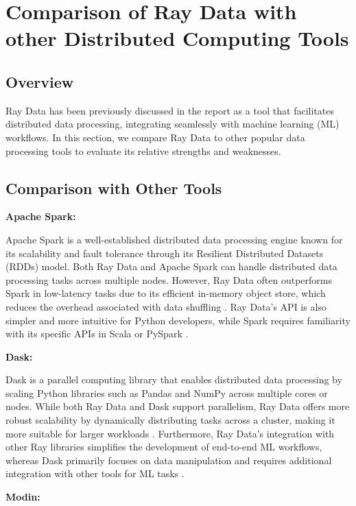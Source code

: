 


\section{Comparison of Ray Data with other Distributed Computing Tools}

\subsection{Overview}

Ray Data has been previously discussed in the report as a tool that facilitates distributed data processing, integrating seamlessly with machine learning (ML) workflows. In this section, we compare Ray Data to other popular data processing tools to evaluate its relative strengths and weaknesses.

\subsection{Comparison with Other Tools}

\textbf{Apache Spark:}

Apache Spark is a well-established distributed data processing engine known for its scalability and fault tolerance through its Resilient Distributed Datasets (RDDs) model. Both Ray Data and Apache Spark can handle distributed data processing tasks across multiple nodes. However, Ray Data often outperforms Spark in low-latency tasks due to its efficient in-memory object store, which reduces the overhead associated with data shuffling \cite{moritz}. Ray Data's API is also simpler and more intuitive for Python developers, while Spark requires familiarity with its specific APIs in Scala or PySpark \cite{apache_spark}.

\textbf{Dask:}

Dask is a parallel computing library that enables distributed data processing by scaling Python libraries such as Pandas and NumPy across multiple cores or nodes. While both Ray Data and Dask support parallelism, Ray Data offers more robust scalability by dynamically distributing tasks across a cluster, making it more suitable for larger workloads \cite{rocklin2015dask}. Furthermore, Ray Data's integration with other Ray libraries simplifies the development of end-to-end ML workflows, whereas Dask primarily focuses on data manipulation and requires additional integration with other tools for ML tasks \cite{dask2022}.

\textbf{Modin:}

